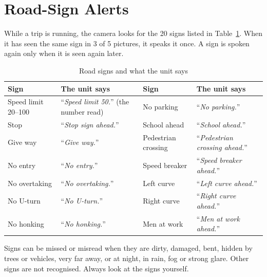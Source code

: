 \documentclass[11pt,a4paper,oneside]{report}
\newcommand{\hdr}[1]{\cellcolor{LightBlue}\textbf{#1}}
\newcommand{\say}[1]{``\textit{#1}''}
\begin{document}
\section{Road-Sign Alerts}\label{sec:signs}
While a trip is running, the camera looks for the 20 signs listed in Table~\ref{tab:signs}. When it has seen the same sign in 3 of 5 pictures, it speaks it once. A sign is spoken again only when it is seen again later.
\begin{table}[H]\centering\small
\caption{Road signs and what the unit says}\label{tab:signs}
\begin{tabularx}{\linewidth}{|l|X||l|X|}\hline
\hdr{Sign} & \hdr{The unit says} & \hdr{Sign} & \hdr{The unit says}\\ \hline
Speed limit 20--100 & \say{Speed limit 50.} (the number read) & No parking & \say{No parking.}\\ \hline
Stop & \say{Stop sign ahead.} & School ahead & \say{School ahead.}\\ \hline
Give way & \say{Give way.} & Pedestrian crossing & \say{Pedestrian crossing ahead.}\\ \hline
No entry & \say{No entry.} & Speed breaker & \say{Speed breaker ahead.}\\ \hline
No overtaking & \say{No overtaking.} & Left curve & \say{Left curve ahead.}\\ \hline
No U-turn & \say{No U-turn.} & Right curve & \say{Right curve ahead.}\\ \hline
No honking & \say{No honking.} & Men at work & \say{Men at work ahead.}\\ \hline
\end{tabularx}\end{table}
\begin{warning}
Signs can be missed or misread when they are dirty, damaged, bent, hidden by trees or vehicles, very far away, or at night, in rain, fog or strong glare. Other signs are not recognised. Always look at the signs yourself.
\end{warning}
\end{document}
